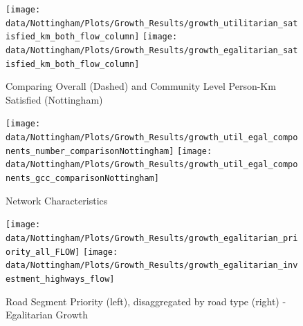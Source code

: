 \documentclass[
]{article}
\begin{document}
\begin{figure}[H]
\texttt{[image: data/Nottingham/Plots/Growth\_Results/growth\_utilitarian\_satisfied\_km\_both\_flow\_column]} \texttt{[image: data/Nottingham/Plots/Growth\_Results/growth\_egalitarian\_satisfied\_km\_both\_flow\_column]} \caption{Comparing Overall (Dashed) and Community Level Person-Km Satisfied (Nottingham)}\label{fig:growthtotalNottingham}
\end{figure}

\begin{figure}[H]

{\centering \texttt{[image: data/Nottingham/Plots/Growth\_Results/growth\_util\_egal\_components\_number\_comparisonNottingham]} \texttt{[image: data/Nottingham/Plots/Growth\_Results/growth\_util\_egal\_components\_gcc\_comparisonNottingham]} 

}

\caption{Network Characteristics}\label{fig:componentsandGCCNottingham}
\end{figure}

\begin{figure}

{\centering \texttt{[image: data/Nottingham/Plots/Growth\_Results/growth\_egalitarian\_priority\_all\_FLOW]} \texttt{[image: data/Nottingham/Plots/Growth\_Results/growth\_egalitarian\_investment\_highways\_flow]} 

}

\caption{Road Segment Priority (left), disaggregated by road type (right) - Egalitarian Growth}\label{fig:growth3MapandBarNottingham}
\end{figure}

\clearpage
\end{document}

